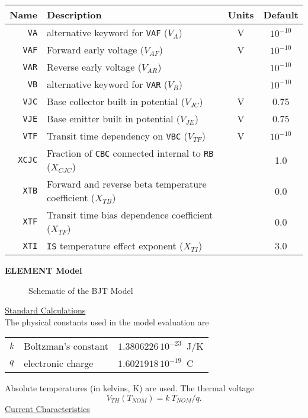 \documentclass{article}
\begin{document}
\begin{tabular}{|r|l|c|c|}
\hline
\textbf{Name} & \textbf{Description} & \textbf{Units} & \textbf{Default} \\
\hline
\texttt{VA} & alternative keyword for \texttt{VAF} ($V_A$) & V & $10^{-10}$ \\
\hline
\texttt{VAF} & Forward early voltage ($V_{AF}$) & V & $10^{-10}$ \\
\hline
\texttt{VAR} & Reverse early voltage ($V_{AR}$) & & $10^{-10}$ \\
\hline
\texttt{VB} & alternative keyword for \texttt{VAR} ($V_B$) & & $10^{-10}$ \\
\hline
\texttt{VJC} & Base collector built in potential ($V_{JC}$) & V & 0.75\\
\hline
\texttt{VJE} & Base emitter built in potential ($V_{JE}$) & V & 0.75 \\
\hline
\texttt{VTF} & Transit time dependency on \texttt{VBC} ($V_{TF}$) & V & $10^{-10}$ \\
\hline
\texttt{XCJC} & Fraction of \texttt{CBC} connected internal to \texttt{RB} ($X_{CJC}$) & & 1.0 \\
\hline
\texttt{XTB} & Forward and reverse beta temperature coefficient ($X_{TB}$) & & 0.0\\
\hline
\texttt{XTF} & Transit time bias dependence coefficient ($X_{TF}$) & & 0.0 \\
\hline
\texttt{XTI} & \texttt{IS} temperature effect exponent ($X_{TI}$) & & 3.0 \\
\hline
\end{tabular}
\newline
\newpage
\textbf{ELEMENT Model}
\newline
\begin{figure}[h]
\centerline{\epsfxsize=4in}
\caption{Schematic
of the BJT Model}
\end{figure}
\newline
\newpage
\noindent\underline{\large Standard Calculations}\\

The physical constants used in the model evaluation are
\begin{center}
\begin{tabular}{|l|l|l|}
\hline
$k$ & Boltzman's constant &  $1.3806226\,10^{-23}$~J/K\\
$q$ & electronic charge & $1.6021918\,10^{-19}$~C\\
\hline
\end{tabular}
\end{center}
Absolute temperatures (in kelvins, K) are used.
The thermal voltage
\begin{equation}
V_{TH}(T_{NOM}) = {{k\ T_{NOM}} / q} .
\end{equation}
\newline
\noindent\underline{Current Characteristics}\\
\end{document}
